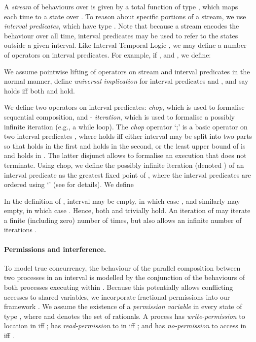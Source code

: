 \documentclass{article}
\theoremstyle{plain}
\theoremstyle{definition}
\begin{document}
A \emph{stream} of behaviours over  is
given by a total function of type , which maps each time to a state over . To reason
about specific portions of a stream, we use \emph{interval
  predicates}, which have type . Note that because a stream encodes the
behaviour over all time, interval predicates may be used to refer to
the states outside a given interval.
Like Interval Temporal Logic
\cite{Mos00}, we may define a number of operators on interval
predicates. For example, if ,
 and , we define:

\noindent
We assume pointwise lifting of operators on stream and interval
predicates in the normal manner, define \emph{universal implication}  for interval predicates  and , and say
 holds iff both  and  hold.

We
define two operators on interval predicates: \emph{chop}, which is
used to formalise sequential composition, and -{\em
  iteration}, which is used to formalise a possibly infinite iteration
(e.g., a while loop). The \emph{chop} operator `;' is a basic operator
on two interval predicates \cite{Mos00,DDH12,DH12MPC}, where  holds iff either interval  may be split into two
parts so that  holds in the first and  holds in the second,
or the least upper bound of  is  and  holds in
. The latter disjunct allows  to formalise an execution
that does not terminate. Using chop, we define the possibly infinite
iteration (denoted ) of an interval predicate  as the
greatest fixed point of , where the
interval predicates are ordered using `' (see \cite{DHMS12}
for details).  We define

\noindent
In the definition of , interval  may be empty,
in which case , and similarly  may empty,
in which case . Hence, both  and  trivially hold. An iteration
 of  may iterate  a finite (including zero) number of
times, but also allows an infinite number of iterations \cite{DHMS12}.











\paragraph{Permissions and interference.}  
To model true concurrency, the behaviour of the parallel composition
between two processes in an interval  is modelled by the
conjunction of the behaviours of both processes executing within
. Because this potentially allows conflicting accesses to
shared variables, we incorporate fractional permissions into our
framework \cite{Boy03,DDH12}.  We assume the existence of a {\em
  permission variable} in every state  of type
, where  and
 denotes the set of rationals.
A process  has {\em write-permission} to location  in  iff ; has {\em
  read-permission} to  in  iff ;
and has {\em no-permission} to access  in  iff
.
\end{document}
